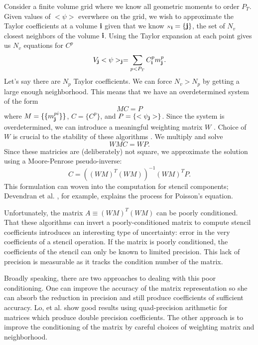 \documentclass{article}
\newcommand{\ibold}{{\bf i}}
\newcommand{\jbold}{{\bf j}}
\newcommand{\cn}{{\scriptscriptstyle N}}
\begin{document}
Consider a finite volume grid where we know all geometric moments to
order $P_T$.  Given values of $<\psi>$ everwhere on the grid, we wish to
approximate the Taylor coefficients at a volume $\ibold$ given that we
know $\cn_\ibold = \{\jbold\}$, the set of $N_v$ closest neighbors of
the volume $\ibold$.  Using the Taylor expansion at each point gives
us $N_v$ equations for $C^p$
\begin{equation}
  V_\jbold <\psi>_\jbold = \sum\limits_{p < P_T} C^p_\ibold m^p_\jbold.
\end{equation}
Let's say there are $N_p$ Taylor coefficients.  We can force $N_v >
N_p$ by getting a large enough neighborhood.  This means that we have
an overdetermined system of the form
\begin{equation*}
M C = P 
\end{equation*}
where $M = \{\{m^{pi}_\jbold\}\}$, $C=\{C^p\}$,  and $P= \{<\psi_\jbold>\}$.
Since the system is overdetermined, we can introduce a 
meaningful weighting matrix $W$ \footnotemark[3].  Choice of $W$
is crucial to the stability of these algorithms
\footnotemark[4].
We multiply and solve
\begin{equation*}
WMC = WP.
\end{equation*}
Since these matricies are (deliberately) not square, we approximate
the solution using a Moore-Penrose pseudo-inverse:
\begin{equation}
  C = ((WM)^T(WM))^{-1} (WM)^T P.
\label{eqn::getC}  
\end{equation}
This formulation can woven into the computation for stencil
components;  Devendran et al. \cite{Devendran2017}, for example, explains the
process for Poisson's equation.

Unfortunately, the matrix $A \equiv (WM)^T(WM)$ can be poorly conditioned.
That these algorithms can invert a poorly-conditioned matrix to compute
stencil coefficients introduces an interesting type of uncertainty: error in
the very coefficients of a stencil operation.   If the matrix is poorly
conditioned, the coefficients of the stencil can only be known to
limited precision.   This lack of precision is measurable as it tracks
the condition number of the matrix.

Broadly speaking, there are two approaches to dealing with this poor
conditioning. One can improve the accuracy of the matrix
representation so she can absorb the reduction in precision and still
produce coefficients of sufficient accuracy.
Lo, et al. \cite{Lo2019} show good results using quad-precision arithmetic
for matrices which produce double precision coefficients.
The other approach is to improve the
conditioning of the matrix by careful choices of weighting matrix and
neighborhood.  
\end{document}
